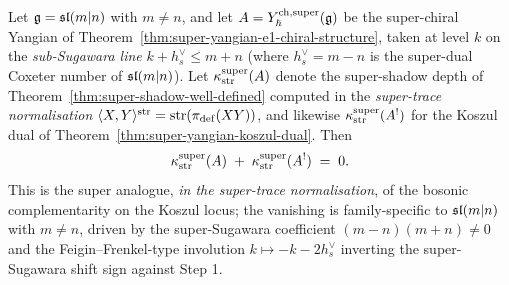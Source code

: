 \begin{theorem}
\label{thm:super-complementarity-supertrace-zero}
Let $\mathfrak{g} = \mathfrak{sl}(m|n)$ with $m\neq n$, and let $A = Y^{\mathrm{ch},\mathrm{super}}_{\hbar}(\mathfrak{g})$
be the super-chiral Yangian of
Theorem~\ref{thm:super-yangian-e1-chiral-structure}, taken at level $k$
on the \emph{sub-Sugawara line} $k+h^{\vee}_{s}\le m+n$ (where
$h^{\vee}_{s}= m-n$ is the super-dual Coxeter number of $\mathfrak{sl}(m|n)$).
Let $\kappa^{\mathrm{super}}_{\operatorname{str}}(A)$ denote the super-shadow depth
of Theorem~\ref{thm:super-shadow-well-defined} computed in the
\emph{super-trace normalisation}
$\langle X,Y\rangle^{\operatorname{str}}=\operatorname{str}(\pi_{\mathrm{def}}(XY))$, and likewise
$\kappa^{\mathrm{super}}_{\operatorname{str}}(A^{!})$ for the Koszul dual of
Theorem~\ref{thm:super-yangian-koszul-dual}. Then
\begin{equation}
 \label{eq:super-complementarity-supertrace}
 \kappa^{\mathrm{super}}_{\operatorname{str}}(A) \;+\;
 \kappa^{\mathrm{super}}_{\operatorname{str}}(A^{!})
 \;=\;
 0.
\end{equation}
This is the super analogue, \emph{in the super-trace normalisation},
of the bosonic complementarity on the Koszul locus; the vanishing is
family-specific to $\mathfrak{sl}(m|n)$ with $m\neq n$, driven by the
super-Sugawara coefficient $(m-n)(m+n)\neq 0$ and the
Feigin--Frenkel-type involution $k\mapsto -k-2h^{\vee}_{s}$ inverting
the super-Sugawara shift sign against Step 1.
\end{theorem}

